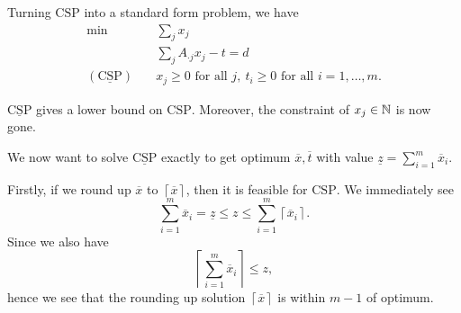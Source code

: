 \begin{problem}
\begin{answer}
	Turning \(\mathrm{CSP}\) into a standard form problem, we have
	\begin{align*}
		\min~                           & \sum\limits_{j} x_{j}                                                         \\
		                                & \sum\limits_{j} A_{\cdot j}x_{j} - t = d                                      \\
		(\mathrm{\underline{CSP}})\quad & x_{j}\geq 0 \text{ for all }j,\ t_{i}\geq 0\text{ for all }i = 1, \ldots , m.
	\end{align*}

	\begin{note}
		\(\mathrm{\underline{CSP}}\) gives a lower bound on \(\mathrm{CSP}\). Moreover, the constraint of \(x_{j}\in\mathbb{\MakeUppercase{N}}\)
		is now gone.
	\end{note}

	We now want to solve \(\mathrm{\underline{CSP}}\) exactly to get optimum \(\overline{x}, \overline{t}\) with value
	\(\underline{z} = \sum\limits_{i=1}^{m} \overline{x}_{i}\).

	Firstly, if we round up \(\overline{x}\) to \(\left\lceil \overline{x} \right\rceil \), then it is feasible for \(\mathrm{CSP}\).
	We immediately see
	\[
		\sum\limits_{i=1}^{m} \overline{x}_{i} = \underline{z} \leq z \leq \sum\limits_{i=1}^{m} \left\lceil \overline{x}_{i} \right\rceil.
	\]
	Since we also have
	\[
		\left\lceil \sum\limits_{i=1}^{m} \overline{x}_{i} \right\rceil \leq z,
	\]
	hence we see that the rounding up solution \(\left\lceil \overline{x} \right\rceil \) is within \(m-1\) of optimum.


\end{answer}
\end{problem}
